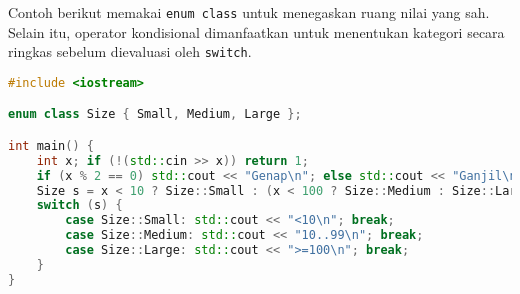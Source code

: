\documentclass[../main.tex]{subfiles}
\begin{document}
Contoh berikut memakai \texttt{enum class} untuk menegaskan ruang nilai yang sah. Selain itu, operator kondisional dimanfaatkan untuk menentukan kategori secara ringkas sebelum dievaluasi oleh \texttt{switch}.

\begin{lstlisting}[language=C++, caption={Contoh pemilihan di C++}, label={lst:cpp-if}]
#include <iostream>

enum class Size { Small, Medium, Large };

int main() {
    int x; if (!(std::cin >> x)) return 1;
    if (x % 2 == 0) std::cout << "Genap\n"; else std::cout << "Ganjil\n";
    Size s = x < 10 ? Size::Small : (x < 100 ? Size::Medium : Size::Large);
    switch (s) {
        case Size::Small: std::cout << "<10\n"; break;
        case Size::Medium: std::cout << "10..99\n"; break;
        case Size::Large: std::cout << ">=100\n"; break;
    }
}
\end{lstlisting}
\end{document}
